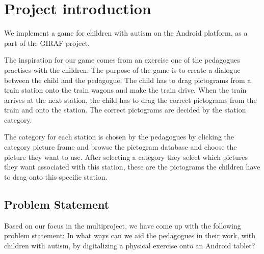 \section*{Project introduction}
We implement a game for children with autism on the Android platform, as a part of the GIRAF project.

The inspiration for our game comes from an exercise one of the pedagogues practises with the children. The purpose of the game is to create a dialogue between the child and the pedagogue. The child has to drag pictograms from a train station onto the train wagons and make the train drive. When the train arrives at the next station, the child has to drag the correct pictograms from the train and onto the station. The correct pictograms are decided by the station
category.

The category for each station is chosen by the pedagogues by clicking the category picture frame and browse the pictogram database and choose the picture they want to use. After selecting a category they select which pictures they want associated with this station, these are the pictograms the children have to drag onto this specific station.

\subsection*{Problem Statement}
Based on our focus in the multiproject, we have come up with the following problem statement:
In what ways can we aid the pedagogues in their work, with children with autism, by digitalizing a physical exercise onto an Android tablet?
